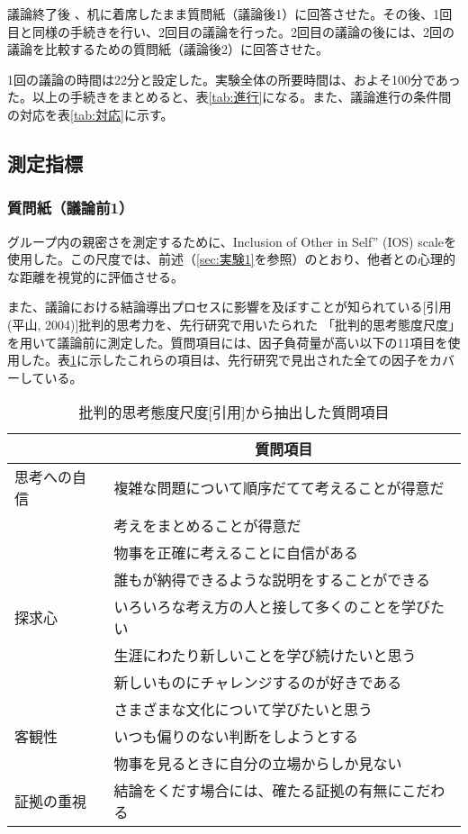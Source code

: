 \documentclass[11pt, a4paper]{jreport} %
\begin{document}
議論終了後%
、机に着席したまま質問紙（議論後1）に回答させた。その後、1回目と同様の手続きを行い、2回目の議論を行った。2回目の議論の後には、2回の議論を比較するための質問紙（議論後2）に回答させた。


1回の議論の時間は22分と設定した。実験全体の所要時間は、およそ100分であった。以上の手続きをまとめると、表\ref{tab:進行}になる。また、議論進行の条件間の対応を表\ref{tab:対応}に示す。


\subsection{測定指標}
\subsubsection*{質問紙（議論前1）}
グループ内の親密さを測定するために、Inclusion of Other in Self” (IOS) scaleを使用した。この尺度では、前述（\ref{sec:実験1}を参照）のとおり、他者との心理的な距離を視覚的に評価させる。



また、議論における結論導出プロセスに影響を及ぼすことが知られている[引用(平山, 2004)]批判的思考力を、先行研究で用いたられた
「批判的思考態度尺度」を用いて議論前に測定した。質問項目には、因子負荷量が高い以下の11項目を使用した。表\ref{tab:hihanteki3}に示したこれらの項目は、先行研究で見出された全ての因子をカバーしている。
\begin{table}[H]
\caption{批判的思考態度尺度{[}引用{]}から抽出した質問項目}
\centering
\label{tab:hihanteki3}
\begin{tabular}{@{}ll@{}}
\toprule
\multicolumn{1}{c}{} & \multicolumn{1}{c}{質問項目} \\ \midrule
思考への自信               & 複雑な問題について順序だてて考えることが得意だ  \\
                     & 考えをまとめることが得意だ            \\
                     & 物事を正確に考えることに自信がある        \\
                     & 誰もが納得できるような説明をすることができる   \\
探求心                  & いろいろな考え方の人と接して多くのことを学びたい \\
                     & 生涯にわたり新しいことを学び続けたいと思う    \\
                     & 新しいものにチャレンジするのが好きである     \\
                     & さまざまな文化について学びたいと思う       \\
客観性                  & いつも偏りのない判断をしようとする        \\
                     & 物事を見るときに自分の立場からしか見ない     \\
証拠の重視                & 結論をくだす場合には、確たる証拠の有無にこだわる \\ \bottomrule
\end{tabular}
\end{table}
\end{document}
